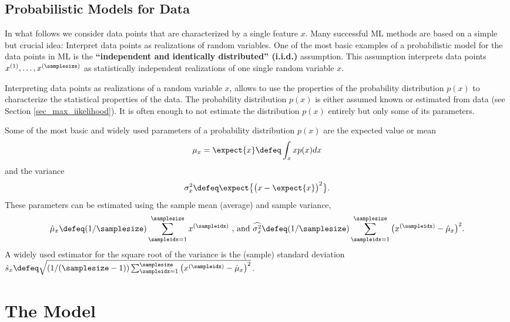 \documentclass[12pt]{report}
\begin{document}
\subsection{Probabilistic Models for Data} 
In what follows we consider data points that are characterized by a 
single feature $x$. Many successful ML methods are based on a simple 
but crucial idea: Interpret data points as realizations of random variables. 
One of the most basic examples of a probabilistic model for the 
data points in ML is the {\bf ``independent and identically distributed'' (i.i.d.)} 
assumption. This assumption interprets data points $x^{(1)},\ldots,x^{(\samplesize)}$ 
as statistically independent realizations of one single random variable $x$.

Interpreting data points as realizations of a random variable $x$, allows to 
use the properties of the probability distribution $p(x)$ to characterize the statistical 
properties of the data. The probability distribution $p(x)$ is either assumed 
known or estimated from data (see Section \ref{sec_max_iikelihood}). It is often 
enough to not estimate the distribution $p(x)$ entirely but only some of its parameters. 

Some of the most basic and widely used parameters of a probability 
distribution $p(x)$ are the expected value or mean 
$$\mu_{x} = \expect\{x\} \defeq \int_{x} x p(x) dx$$ 
and the variance 
$$\sigma_{x}^{2} \defeq \expect\big\{\big(x-\expect\{x\}\big)^{2}\big\}.$$ 
These parameters can be estimated using the sample mean 
(average) and sample variance, 
\begin{equation} 
\hat{\mu}_{x} \defeq (1/\samplesize) \sum_{\sampleidx=1}^{\samplesize} x^{(\sampleidx)}\mbox{ , and } \widehat{\sigma^{2}_{x}} \defeq (1/\samplesize) \sum_{\sampleidx=1}^{\samplesize} \big( x^{(\sampleidx)} - \hat{\mu}_{x} \big)^{2}.  
\end{equation} 
A widely used estimator for the square root of the variance is the 
(sample) standard deviation $\hat{s}_{x} \defeq  \sqrt{(1/(\samplesize-1)) \sum_{\sampleidx=1}^{\samplesize} \big( x^{(\sampleidx)} - \hat{\mu}_{x} \big)^{2}}$. 




\section{The Model}
\label{sec_hypo_space}
\end{document}

